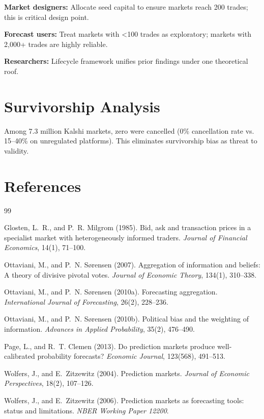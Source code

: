 \documentclass[a4paper,11pt]{article}
\theoremstyle{plain}
\theoremstyle{definition}
\begin{document}
\textbf{Market designers:} Allocate seed capital to ensure markets reach 200 trades; this is critical design point.

\textbf{Forecast users:} Treat markets with <100 trades as exploratory; markets with 2,000+ trades are highly reliable.

\textbf{Researchers:} Lifecycle framework unifies prior findings under one theoretical roof.

\section{Survivorship Analysis}
\label{sec:survivorship}

Among 7.3 million Kalshi markets, zero were cancelled (0\% cancellation rate vs. 15--40\% on unregulated platforms). This eliminates survivorship bias as threat to validity.

\newpage

\section*{References}

\begin{thebibliography}{99}

Glosten, L.~R., and P.~R. Milgrom (1985).
\newblock Bid, ask and transaction prices in a specialist market with heterogeneously informed traders.
\newblock \textit{Journal of Financial Economics}, 14(1), 71--100.

Ottaviani, M., and P.~N. Sørensen (2007).
\newblock Aggregation of information and beliefs: A theory of divisive pivotal votes.
\newblock \textit{Journal of Economic Theory}, 134(1), 310--338.

Ottaviani, M., and P.~N. Sørensen (2010a).
\newblock Forecasting aggregation.
\newblock \textit{International Journal of Forecasting}, 26(2), 228--236.

Ottaviani, M., and P.~N. Sørensen (2010b).
\newblock Political bias and the weighting of information.
\newblock \textit{Advances in Applied Probability}, 35(2), 476--490.

Page, L., and R.~T. Clemen (2013).
\newblock Do prediction markets produce well-calibrated probability forecasts?
\newblock \textit{Economic Journal}, 123(568), 491--513.

Wolfers, J., and E.~Zitzewitz (2004).
\newblock Prediction markets.
\newblock \textit{Journal of Economic Perspectives}, 18(2), 107--126.

Wolfers, J., and E.~Zitzewitz (2006).
\newblock Prediction markets as forecasting tools: status and limitations.
\newblock \textit{NBER Working Paper 12200}.

\end{thebibliography}
\end{document}
